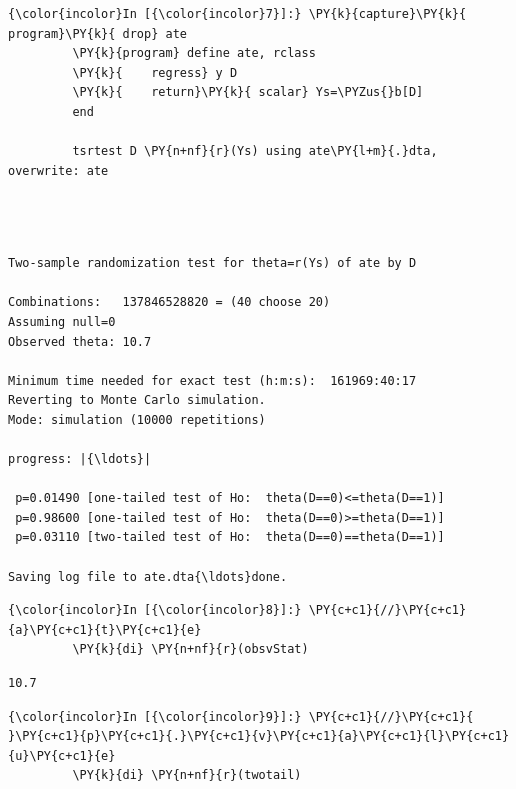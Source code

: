 \documentclass[11pt,notitlepage]{article}\usepackage[]{graphicx}\usepackage[]{color}
\makeatletter
\newenvironment{kframe}{%
 \def\at@end@of@kframe{}%
 \ifinner\ifhmode%
  \def\at@end@of@kframe{\end{minipage}}%
  \begin{minipage}{\columnwidth}%
 \fi\fi%
 \def\FrameCommand##1{\hskip\@totalleftmargin \hskip-\fboxsep
 \colorbox{shadecolor}{##1}\hskip-\fboxsep
     \hskip-\linewidth \hskip-\@totalleftmargin \hskip\columnwidth}%
 \MakeFramed {\advance\hsize-\width
   \@totalleftmargin\z@ \linewidth\hsize
   \@setminipage}}%
 {\par\unskip\endMakeFramed%
 \at@end@of@kframe}
\newenvironment{knitrout}{}{} %
\makeatother
\begin{document}
\begin{enumerate}[a)]
\begin{knitrout}
\color{fgcolor}\begin{kframe}

    \begin{Verbatim}[commandchars=\\\{\}]
{\color{incolor}In [{\color{incolor}7}]:} \PY{k}{capture}\PY{k}{ program}\PY{k}{ drop} ate
         \PY{k}{program} define ate, rclass
         \PY{k}{	regress} y D
         \PY{k}{    return}\PY{k}{ scalar} Ys=\PYZus{}b[D]
         end
         
         tsrtest D \PY{n+nf}{r}(Ys) using ate\PY{l+m}{.}dta, overwrite: ate
\end{Verbatim}

    \begin{Verbatim}[commandchars=\\\{\}]



Two-sample randomization test for theta=r(Ys) of ate by D

Combinations:   137846528820 = (40 choose 20)
Assuming null=0
Observed theta: 10.7

Minimum time needed for exact test (h:m:s):  161969:40:17
Reverting to Monte Carlo simulation.
Mode: simulation (10000 repetitions)

progress: |{\ldots}|

 p=0.01490 [one-tailed test of Ho:  theta(D==0)<=theta(D==1)]
 p=0.98600 [one-tailed test of Ho:  theta(D==0)>=theta(D==1)]
 p=0.03110 [two-tailed test of Ho:  theta(D==0)==theta(D==1)]

Saving log file to ate.dta{\ldots}done.

    \end{Verbatim}

    \begin{Verbatim}[commandchars=\\\{\}]
{\color{incolor}In [{\color{incolor}8}]:} \PY{c+c1}{//}\PY{c+c1}{a}\PY{c+c1}{t}\PY{c+c1}{e}
         \PY{k}{di} \PY{n+nf}{r}(obsvStat)
\end{Verbatim}

    \begin{Verbatim}[commandchars=\\\{\}]
10.7

    \end{Verbatim}

    \begin{Verbatim}[commandchars=\\\{\}]
{\color{incolor}In [{\color{incolor}9}]:} \PY{c+c1}{//}\PY{c+c1}{ }\PY{c+c1}{p}\PY{c+c1}{.}\PY{c+c1}{v}\PY{c+c1}{a}\PY{c+c1}{l}\PY{c+c1}{u}\PY{c+c1}{e}
         \PY{k}{di} \PY{n+nf}{r}(twotail)
\end{Verbatim}


\end{kframe}
\end{knitrout}
\end{enumerate}
\end{document}
